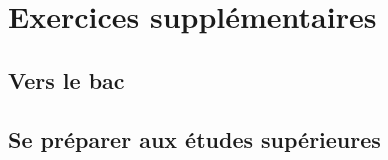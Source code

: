 \documentclass[12pt,french,oneside]{report}
\begin{document}
\begin{spacing}{1.2}
\section{}






\section*{Exercices supplémentaires}

\subsection*{Vers le bac}


\subsection*{Se préparer aux études supérieures}






\end{spacing}
\end{document}
